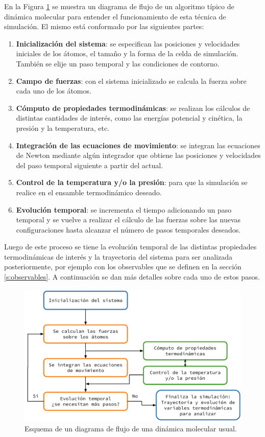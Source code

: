 En la Figura \ref{fig:esquema_md} se muestra un diagrama de flujo de un algoritmo
típico de dinámica molecular para entender el funcionamiento de esta técnica de 
simulación. El mismo está conformado por las siguientes partes:
\begin{enumerate}
    \item \textbf{Inicialización del sistema}: se especifican las posiciones y
        velocidades iniciales de los átomos, el tamaño y la forma de la celda de 
        simulación. También se elije un paso temporal y las condiciones de 
        contorno.
    \item \textbf{Campo de fuerzas}: con el sistema inicializado se calcula la 
        fuerza sobre cada uno de los átomos.
    \item \textbf{Cómputo de propiedades termodinámicas}: se realizan los
        cálculos de distintas cantidades de interés, como las energías potencial
        y cinética, la presión y la temperatura, etc.
    \item \textbf{Integración de las ecuaciones de movimiento}: se integran las
        ecuaciones de Newton mediante algún integrador que obtiene las posiciones
        y velocidades del paso temporal siguiente a partir del actual.
    \item \textbf{Control de la temperatura y/o la presión}: para que la 
        simulación se realice en el ensamble termodinámico deseado.
    \item \textbf{Evolución temporal}: se incrementa el tiempo adicionando un
        paso temporal y se vuelve a realizar el cálculo de las fuerzas sobre las 
        nuevas configuraciones hasta alcanzar el número de pasos temporales 
        deseados.
\end{enumerate}
Luego de este proceso se tiene la evolución temporal de las distintas propiedades
termodinámicas de interés y la trayectoria del sistema para ser analizada 
posteriormente, por ejemplo con los observables que se definen en la sección 
\ref{s:observables}. A continuación se dan más detalles sobre cada uno de estos pasos.
\begin{figure}[h!]
    \centering
    \includegraphics[width=\textwidth]{Metodos/atomicos/esquema.png}
    \caption{Esquema de un diagrama de flujo de una dinámica molecular usual.}
    \label{fig:esquema_md}
\end{figure}


